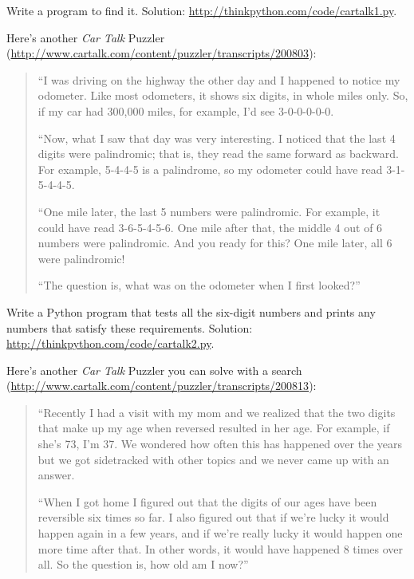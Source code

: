 \documentclass[10pt]{book}
\begin{document}
\begin{CJK}{UTF8}{gbsn}
\begin{exercise}
Write a program to find it.  Solution: \url{http://thinkpython.com/code/cartalk1.py}.

\end{exercise}


\begin{exercise}
Here's another {\em Car Talk}
Puzzler (\url{http://www.cartalk.com/content/puzzler/transcripts/200803}):

\begin{quote}
``I was driving on the highway the other day and I happened to
notice my odometer. Like most odometers, it shows six digits,
in whole miles only. So, if my car had 300,000
miles, for example, I'd see 3-0-0-0-0-0.

``Now, what I saw that day was very interesting. I noticed that the
last 4 digits were palindromic; that is, they read the same forward as
backward. For example, 5-4-4-5 is a palindrome, so my odometer
could have read 3-1-5-4-4-5.

``One mile later, the last 5 numbers were palindromic. For example, it
could have read 3-6-5-4-5-6.  One mile after that, the middle 4 out of
6 numbers were palindromic.  And you ready for this? One mile later,
all 6 were palindromic!

``The question is, what was on the odometer when I first looked?''
\end{quote}

Write a Python program that tests all the six-digit numbers and prints
any numbers that satisfy these requirements.  
Solution: \url{http://thinkpython.com/code/cartalk2.py}.

\end{exercise}


\begin{exercise}
Here's another {\em Car Talk} Puzzler you can solve with a
search (\url{http://www.cartalk.com/content/puzzler/transcripts/200813}):

\begin{quote}
``Recently I had a visit with my mom and we realized that
the two digits that make up my age when reversed resulted in her
age. For example, if she's 73, I'm 37. We wondered how often this has
happened over the years but we got sidetracked with other topics and
we never came up with an answer.

``When I got home I figured out that the digits of our ages have been
reversible six times so far. I also figured out that if we're lucky it
would happen again in a few years, and if we're really lucky it would
happen one more time after that. In other words, it would have
happened 8 times over all. So the question is, how old am I now?''


\end{quote}
\end{exercise}
\end{CJK}
\end{document}
